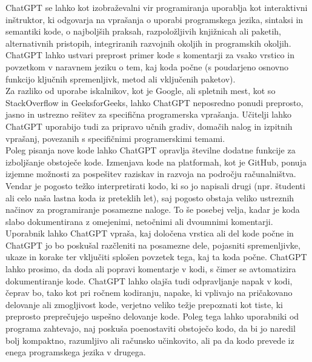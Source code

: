 \documentclass[a4paper,12pt,openright]{book}
\begin{document}
ChatGPT se lahko kot izobraževalni vir programiranja uporablja kot interaktivni inštruktor, ki odgovarja na vprašanja o uporabi programskega jezika, sintaksi in semantiki kode, o najboljših praksah, razpoložljivih knjižnicah ali paketih, alternativnih pristopih, integriranih razvojnih okoljih in programskih okoljih. ChatGPT lahko ustvari preprost primer kode s komentarji za vsako vrstico in povzetkom v naravnem jeziku o tem, kaj koda počne (s poudarjeno osnovno funkcijo ključnih spremenljivk, metod ali vključenih paketov). \cite{openai_chatgpt} \\
Za razliko od uporabe iskalnikov, kot je Google, ali spletnih mest, kot so StackOverflow in GeeksforGeeks, lahko ChatGPT neposredno ponudi preprosto, jasno in ustrezno rešitev za specifična programerska vprašanja. Učitelji lahko ChatGPT uporabijo tudi za pripravo učnih gradiv, domačih nalog in izpitnih vprašanj, povezanih s specifičnimi programerskimi temami. \cite{Meyer2023} \\
Poleg pisanja nove kode lahko ChatGPT opravlja številne dodatne funkcije za izboljšanje obstoječe kode. Izmenjava kode na platformah, kot je GitHub, ponuja izjemne možnosti za pospešitev raziskav in razvoja na področju računalništva. Vendar je pogosto težko interpretirati kodo, ki so jo napisali drugi (npr. študenti ali celo naša lastna koda iz preteklih let), saj pogosto obstaja veliko ustreznih načinov za programiranje posamezne naloge. To še posebej velja, kadar je koda slabo dokumentirana z omejenimi, netočnimi ali dvoumnimi komentarji. Uporabnik lahko ChatGPT vpraša, kaj določena vrstica ali del kode počne in ChatGPT jo bo poskušal razčleniti na posamezne dele, pojasniti spremenljivke, ukaze in korake ter vključiti splošen povzetek tega, kaj ta koda počne. ChatGPT lahko prosimo, da doda ali popravi komentarje v kodi, s čimer se avtomatizira dokumentiranje kode. ChatGPT lahko olajša tudi odpravljanje napak v kodi, čeprav bo, tako kot pri ročnem kodiranju, napake, ki vplivajo na pričakovano delovanje ali zmogljivost kode, verjetno veliko težje prepoznati kot tiste, ki preprosto preprečujejo uspešno delovanje kode. Poleg tega lahko uporabniki od programa zahtevajo, naj poskuša poenostaviti obstoječo kodo, da bi jo naredil bolj kompaktno, razumljivo ali računsko učinkovito, ali pa da kodo prevede iz enega programskega jezika v drugega. \cite{Meyer2023}
\end{document}
